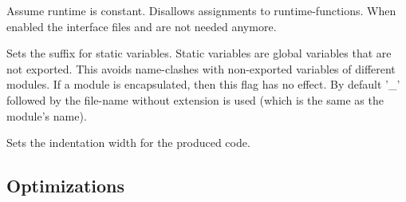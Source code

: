 \begin{Description}
\item[\Opt{--constant-runtime}] Assume runtime is constant. Disallows
assignments to runtime-functions. When enabled the interface files
 and
 are not needed anymore.
\item[\OptArg{--statics-suffix}{ suffix}] Sets the suffix for
static variables. Static variables are global variables that are not
exported. This avoids name-clashes with non-exported variables of different
modules. If a module is encapsulated, then this flag has no effect. By default
'_' followed by the file-name without extension is used (which is the same as
the module's name).
\item[\OptArg{--indent}{ width}] Sets the indentation width for the
produced code.
\end{Description}
\subsection{Optimizations}

